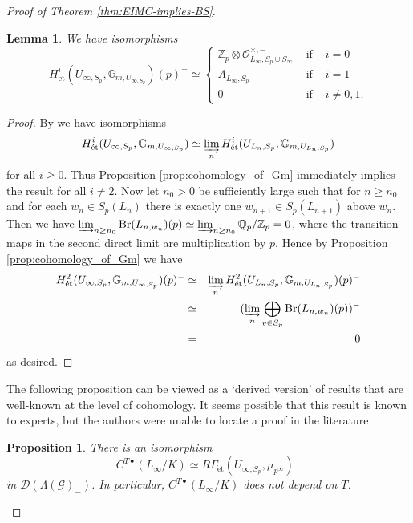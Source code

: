 \documentclass[12pt]{amsart}
\theoremstyle{plain}
\newtheorem{lemma}[theorem]{Lemma}
\newtheorem{prop}[theorem]{Proposition}
\theoremstyle{remark}
\theoremstyle{definition}
\numberwithin{equation}{section}
\begin{document}
{\begin{proof}[Proof of Theorem \ref{thm:EIMC-implies-BS}]
\begin{lemma}\label{lem:H2-vanishes}
We have isomorphisms
\[
H_{\mathrm{\acute{e}t}}^{i}(U_{\infty, S_{p}}, \mathbb{G}_{m, U_{\infty, S_{p}}})(p)^{-} \simeq \left\{
\begin{array}{lll}
{\mathbb{Z}}_{p} \otimes \mathcal{O}_{L_{\infty}, S_{p} \cup S_{\infty}}^{\times,-} & \mbox{ if } & i=0\\
A_{L_{\infty}, S_{p}} & \mbox{ if } & i=1\\
0 & \mbox{ if } & i \not= 0,1.
\end{array}
\right.
\]
\end{lemma}

\begin{proof}
By \cite[Chapter III, Lemma 1.16]{MR559531} we have isomorphisms
\[
H_{\mathrm{\acute{e}t}}^{i}(U_{\infty, S_{p}}, \mathbb{G}_{m, U_{\infty, S_{p}}}) \simeq
\varinjlim_{n} H_{\mathrm{\acute{e}t}}^{i}(U_{L_{n}, S_{p}}, \mathbb{G}_{m, U_{L_{n}, S_{p}}})
\]
for all $i \geq 0$. 
Thus Proposition \ref{prop:cohomology_of_Gm} immediately implies the result for all $i \neq 2$.
Now let $n_{0}>0$ be sufficiently large such that for $n \geq n_{0}$
and for each $w_{n} \in S_{p}(L_{n})$ there is exactly one $w_{n+1} \in S_{p}(L_{n+1})$ above $w_{n}$.
Then we have $\varinjlim_{n \geq n_{0}} {\mathrm{Br}}(L_{n, w_{n}})(p) \simeq \varinjlim_{n \geq n_{0}} {\mathbb{Q}}_{p} / {\mathbb{Z}}_{p} = 0$,
where the transition maps in the second direct limit
are multiplication by $p$. Hence by Proposition \ref{prop:cohomology_of_Gm} we have
\begin{eqnarray*}
H_{\mathrm{\acute{e}t}}^{2}(U_{\infty, S_{p}}, \mathbb{G}_{m, U_{\infty, S_{p}}})(p)^{-} & \simeq &
\varinjlim_{n} H_{\mathrm{\acute{e}t}}^{2}(U_{L_{n}, S_{p}}, \mathbb{G}_{m, U_{L_{n}, S_{p}}})(p)^{-} \\
& \simeq & (\varinjlim_{n} \bigoplus_{v \in S_{p}} {\mathrm{Br}}(L_{n, w_{n}})(p))^{-} \\
& = & 0
\end{eqnarray*}
as desired.
\end{proof}

The following proposition can be viewed as a `derived version' of results that are well-known at the level of cohomology.
It seems possible that this result is known to experts, but the authors were unable to locate a proof in the literature.

\begin{prop} \label{prop:coh-interpretation-Linfty/K}
There is an isomorphism
\[
C^{T \bullet}(L_{\infty}/K)  \simeq R\Gamma_{\mathrm{\acute{e}t}}(U_{\infty, S_{p}}, \mu_{p^{\infty}})^{-}
\]
in $\mathcal{D}(\Lambda(\mathcal{G})_{-})$. In particular, $C^{T \bullet}(L_{\infty}/K)$ does not depend on $T$.
\end{prop}


\end{proof}}
\end{document}
